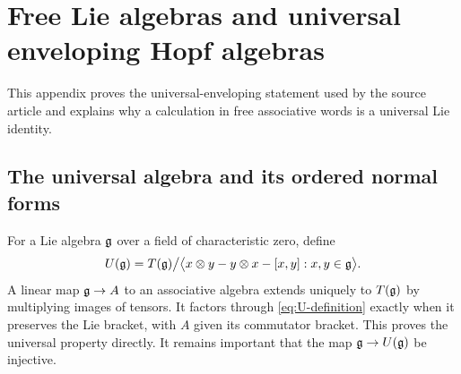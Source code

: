 \section{Free Lie algebras and universal enveloping Hopf algebras}\label{sec:pbw}
This appendix proves the universal-enveloping statement used by the source article and explains why a calculation in free associative words is a universal Lie identity.

\subsection{The universal algebra and its ordered normal forms}
For a Lie algebra $\mathfrak g$ over a field of characteristic zero, define
\begin{equation}\label{eq:U-definition}
 U(\mathfrak g)=T(\mathfrak g)\big/\bigl\langle x\otimes y-y\otimes x-[x,y]:x,y\in\mathfrak g\bigr\rangle.
\end{equation}
A linear map $\mathfrak g\to A$ to an associative algebra extends uniquely to $T(\mathfrak g)$ by multiplying images of tensors. It factors through \cref{eq:U-definition} exactly when it preserves the Lie bracket, with $A$ given its commutator bracket. This proves the universal property directly. It remains important that the map $\mathfrak g\to U(\mathfrak g)$ be injective.

